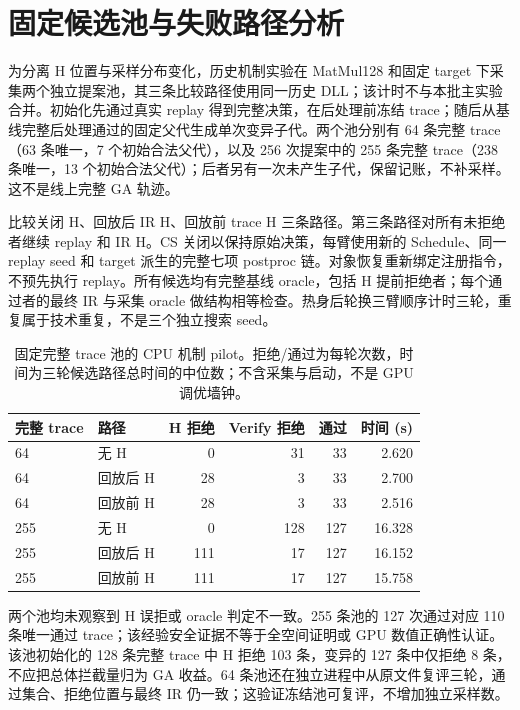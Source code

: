 \section{固定候选池与失败路径分析}
\label{sec:frozen-pool}
为分离 H 位置与采样分布变化，历史机制实验在 MatMul128 和固定 target 下采集两个独立提案池，其三条比较路径使用同一历史 DLL；该计时不与本批主实验合并。初始化先通过真实 replay 得到完整决策，在后处理前冻结 trace；随后从基线完整后处理通过的固定父代生成单次变异子代。两个池分别有 64 条完整 trace（63 条唯一，7 个初始合法父代），以及 256 次提案中的 255 条完整 trace（238 条唯一，13 个初始合法父代）；后者另有一次未产生子代，保留记账，不补采样。这不是线上完整 GA 轨迹。

比较关闭 H、回放后 IR H、回放前 trace H 三条路径。第三条路径对所有未拒绝者继续 replay 和 IR H。CS 关闭以保持原始决策，每臂使用新的 Schedule、同一 replay seed 和 target 派生的完整七项 postproc 链。对象恢复重新绑定注册指令，不预先执行 replay。所有候选均有完整基线 oracle，包括 H 提前拒绝者；每个通过者的最终 IR 与采集 oracle 做结构相等检查。热身后轮换三臂顺序计时三轮，重复属于技术重复，不是三个独立搜索 seed。

\begin{table}[tb]
\centering
\caption{固定完整 trace 池的 CPU 机制 pilot。拒绝/通过为每轮次数，时间为三轮候选路径总时间的中位数；不含采集与启动，不是 GPU 调优墙钟。}
\label{tab:frozen-pool}
\begin{tabular}{llrrrr}
\toprule
完整 trace & 路径 & H 拒绝 & Verify 拒绝 & 通过 & 时间 (s) \\
\midrule
64 & 无 H & 0 & 31 & 33 & 2.620 \\
64 & 回放后 H & 28 & 3 & 33 & 2.700 \\
64 & 回放前 H & 28 & 3 & 33 & 2.516 \\
\midrule
255 & 无 H & 0 & 128 & 127 & 16.328 \\
255 & 回放后 H & 111 & 17 & 127 & 16.152 \\
255 & 回放前 H & 111 & 17 & 127 & 15.758 \\
\bottomrule
\end{tabular}
\end{table}

两个池均未观察到 H 误拒或 oracle 判定不一致。255 条池的 127 次通过对应 110 条唯一通过 trace；该经验安全证据不等于全空间证明或 GPU 数值正确性认证。该池初始化的 128 条完整 trace 中 H 拒绝 103 条，变异的 127 条中仅拒绝 8 条，不应把总体拦截量归为 GA 收益。64 条池还在独立进程中从原文件复评三轮，通过集合、拒绝位置与最终 IR 仍一致；这验证冻结池可复评，不增加独立采样数。

